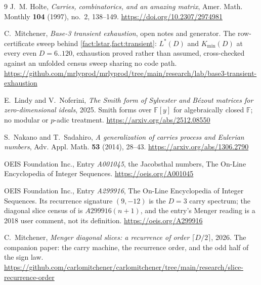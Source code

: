 \documentclass[11pt]{amsart}
\theoremstyle{definition}
\theoremstyle{remark}
\begin{document}
\begin{thebibliography}{9}
J.~M. Holte, \emph{Carries, combinatorics, and an amazing matrix}, Amer. Math. Monthly \textbf{104} (1997), no.~2, 138--149. \url{https://doi.org/10.2307/2974981}

C.~Mitchener, \emph{Base-3 transient exhaustion}, open notes and generator. The row-certificate sweep behind \cref{fact:lstar,fact:transient}: $L^{*}(D)$ and $K_{\min}(D)$ at every even $D = 6..120$, exhaustion proved rather than assumed, cross-checked against an unfolded census sweep sharing no code path. \url{https://github.com/mrlyprod/mrlyprod/tree/main/research/lab/base3-transient-exhaustion}

E.~Lindy and V.~Noferini, \emph{The Smith form of Sylvester and B\'ezout matrices for zero-dimensional ideals}, 2025. Smith forms over $\mathbb{F}[y]$ for algebraically closed $\mathbb{F}$; no modular or $p$-adic treatment. \url{https://arxiv.org/abs/2512.08550}

S.~Nakano and T.~Sadahiro, \emph{A generalization of carries process and Eulerian numbers}, Adv. Appl. Math. \textbf{53} (2014), 28--43. \url{https://arxiv.org/abs/1306.2790}

OEIS Foundation Inc., Entry \emph{A001045}, the Jacobsthal numbers, The On-Line Encyclopedia of Integer Sequences. \url{https://oeis.org/A001045}

OEIS Foundation Inc., Entry \emph{A299916}, The On-Line Encyclopedia of Integer Sequences. Its recurrence signature $(9,-12)$ is the $D = 3$ carry spectrum; the diagonal slice census of \cite{slice-order} is $A299916(n+1)$, and the entry's Menger reading is a 2018 user comment, not its definition. \url{https://oeis.org/A299916}

C.~Mitchener, \emph{Menger diagonal slices: a recurrence of order $\lceil D/2 \rceil$}, 2026. The companion paper: the carry machine, the recurrence order, and the odd half of the sign law. \url{https://github.com/carlomitchener/carlomitchener/tree/main/research/slice-recurrence-order}

\end{thebibliography}
\end{document}
